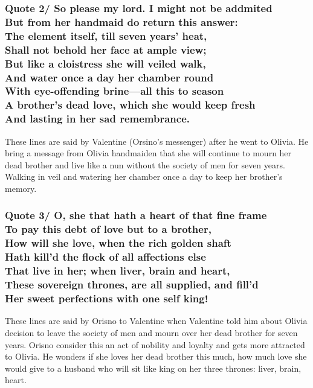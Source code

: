 \documentclass[12pt, a4paper]{article}
\begin{document}
\subsubsection*{Quote 2/ 
  So please my lord. I might not be addmited\\ 
  But from her handmaid do return this answer:\\
  The element itself, till seven years' heat, \\
  Shall not behold her face at ample view;\\ 
  But like a cloistress she will veiled walk,\\ 
  And water once a day her chamber round \\ 
  With eye-offending brine---all this to season\\
  A brother's dead love, which she would keep fresh\\
  And lasting in her sad remembrance.
}

These lines are said by Valentine (Orsino's messenger) after he went
to Olivia. He bring a message from Olivia handmaiden that she will 
continue to mourn her dead brother and live like a nun without the 
society of men for seven years. Walking in veil and watering her 
chamber once a day to keep her brother's memory.

\subsubsection*{Quote 3/
  O, she that hath a heart of that fine frame\\
  To pay this debt of love but to a brother,\\
	How will she love, when the rich golden shaft\\
	Hath kill'd the flock of all affections else\\
	That live in her; when liver, brain and heart,\\
	These sovereign thrones, are all supplied, and fill'd\\
	Her sweet perfections with one self king!
}

These lines are said by Orisno to Valentine when Valentine told him
about Olivia decision to leave the society of men and mourn over her
dead brother for seven years. Orisno consider this an act of nobility and
loyalty and gets more attracted to Olivia. He wonders if she loves her
dead brother this much, how much love she would give to a husband who 
will sit like king on her three thrones: liver, brain, heart.
\end{document}

